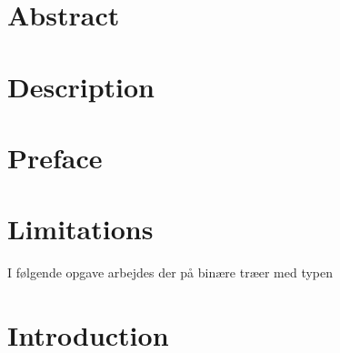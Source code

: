 \documentclass[12pt]{article} %
\begin{document}






\newpage %
\tableofcontents
\newpage





\section{Abstract}

\section{Description}

\section{Preface}

\section{Limitations}

I følgende opgave arbejdes der på binære træer med typen 

\section{Introduction}
\end{document}
